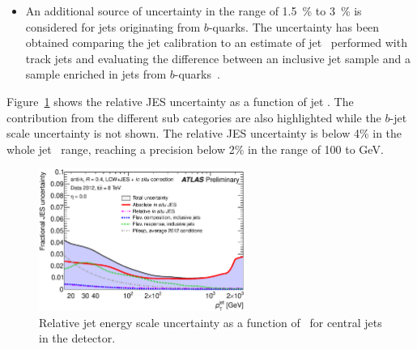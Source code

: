 \begin{itemize}
\item An additional source of uncertainty in the range of 1.5~\% to 3~\% is considered for jets originating from $b$-quarks. 
The uncertainty has been obtained comparing the jet calibration to an estimate of jet \pT\ performed with track jets
and evaluating the difference between an inclusive jet sample and a sample enriched in jets from $b$-quarks~\cite{JetBJes}.

\end{itemize}

Figure~\ref{fig:OBjes} shows the relative JES uncertainty as a function of jet \pT. The contribution from the different sub categories are also highlighted while the $b$-jet scale uncertainty is not shown. 
The relative JES uncertainty is below 4\% in the whole jet \pT\ range, reaching a precision below 2\% in the range of 100 to \unit[1000]{\GeV}.
 
 
\begin{figure}[tb!]
\centering
   \includegraphics[width=0.6\textwidth]{Objects/Figures/JESUncertainty-Moriond2013-Dijet-LC4-pT-noCloseby.eps}
\caption{Relative jet energy scale uncertainty as a function of \pT\ for central jets in the detector.}
\label{fig:OBjes}
\end{figure}
  
